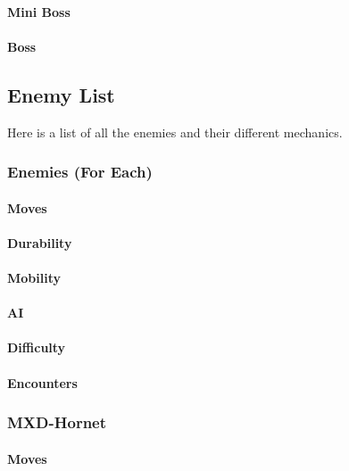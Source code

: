 \documentclass[12pt]{article}
\begin{document}
\paragraph{Mini Boss}

\paragraph{Boss}
\subsection{Enemy List}

Here is a list of all the enemies and their different mechanics. 

\subsubsection{Enemies (For Each)}

\paragraph{Moves}

\paragraph{Durability}

\paragraph{Mobility}

\paragraph{AI}

\paragraph{Difficulty}

\paragraph{Encounters}

\subsubsection{MXD-Hornet}

\paragraph{Moves}
\end{document}
